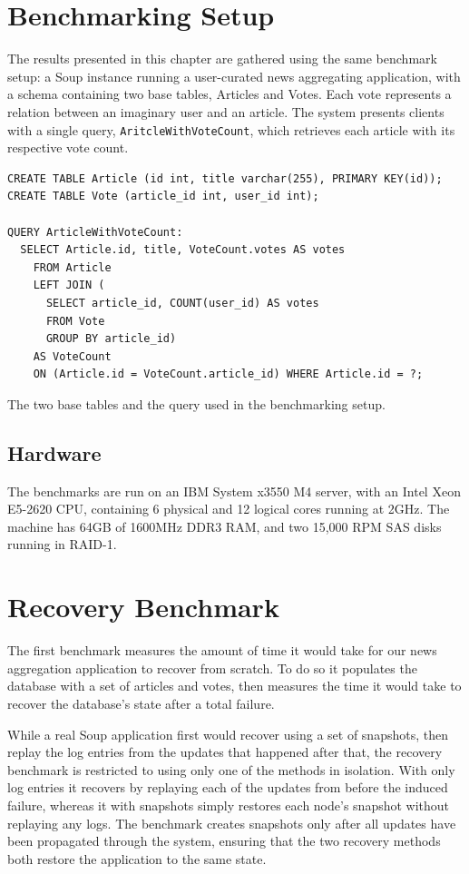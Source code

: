 \documentclass[b5paper]{report}
\begin{document}
\section{Benchmarking Setup} \label{sec:vote}
The results presented in this chapter are gathered using the same benchmark
setup: a Soup instance running a user-curated news aggregating
application, with a schema containing two base tables, Articles and Votes. Each vote
represents a relation between an imaginary user and an article. The system
presents clients with a single query, \texttt{AritcleWithVoteCount}, which
retrieves each article with its respective vote count.

\begin{listing}[H]
  \begin{verbatim}
CREATE TABLE Article (id int, title varchar(255), PRIMARY KEY(id));
CREATE TABLE Vote (article_id int, user_id int);

QUERY ArticleWithVoteCount:
  SELECT Article.id, title, VoteCount.votes AS votes
    FROM Article
    LEFT JOIN (
      SELECT article_id, COUNT(user_id) AS votes
      FROM Vote
      GROUP BY article_id)
    AS VoteCount
    ON (Article.id = VoteCount.article_id) WHERE Article.id = ?;
\end{verbatim}
  \caption{
    The two base tables and the query used in the benchmarking setup.
    \label{lst:benchmark-schema}
  }
\end{listing}

\subsection{Hardware}
The benchmarks are run on an IBM System x3550 M4 server, with an Intel Xeon
E5-2620 CPU, containing 6 physical and 12 logical cores running at 2GHz. The machine
has 64GB of 1600MHz DDR3 RAM, and two 15,000 RPM SAS disks running in RAID-1.

\section{Recovery Benchmark}
The first benchmark measures the amount of time it would take for our news
aggregation application to recover from scratch. To do so it populates the
database with a set of articles and votes, then measures the time it
would take to recover the database's state after a total failure.

While a real Soup application first would recover using a set of snapshots, then
replay the log entries from the updates that happened after that, the recovery
benchmark is restricted to using only one of the methods in isolation. With
only log entries it recovers by replaying each of the updates from before the
induced failure, whereas it with snapshots simply restores each node's snapshot
without replaying any logs. The benchmark creates snapshots only after all
updates have been propagated through the system, ensuring that the two recovery
methods both restore the application to the same state.
\end{document}
